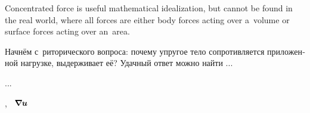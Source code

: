 

{\small
Concentrated force is useful mathematical idealization, but cannot be found in the real world, where all forces are either body forces acting over a~volume or surface forces acting over an~area.
\par}

\begin{otherlanguage}{russian}

Начнём с~риторического вопроса: почему упругое тело сопротивляется приложенной нагрузке, выдерживает её?
Удачный ответ можно найти ...

...

\end{otherlanguage}



\label{para:displacementsfromdeformations}

 , ~${\bm{\nabla}\hspace{-0.2ex} \bm{u}}$   

